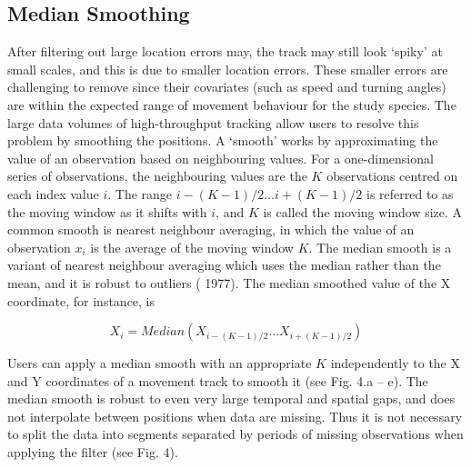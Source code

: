 \documentclass[10pt,paper=a4,headings=standardclasses
]{scrartcl}
\begin{document}
\subsection{Median Smoothing}

After filtering out large location errors may, the track may still look ‘spiky’ at small scales, and this is due to smaller location errors.
These smaller errors are challenging to remove since their covariates (such as speed and turning angles) are within the expected range of movement behaviour for the study species. 
The large data volumes of high-throughput tracking allow users to resolve this problem by smoothing the positions. 
A ‘smooth’ works by approximating the value of an observation based on neighbouring values.
For a one-dimensional series of observations, the neighbouring values are the $K$ observations centred on each index value $i$.
The range $ {i - (K-1)/2} \ldots {i + (K-1)/2} $ is referred to as the moving window as it shifts with $i$, and $K$ is called the moving window size.
A common smooth is nearest neighbour averaging, in which the value of an observation $x_i$ is the average of the moving window $K$.
The median smooth is a variant of nearest neighbour averaging which uses the median rather than the mean, and it is robust to outliers (\citeauthor{tukey1977} 1977).
The median smoothed value of the X coordinate, for instance, is
\begin{linenomath*}
    \begin{equation*}
        X_i = Median(X_{i - (K-1)/2} \ldots X_{i + (K-1)/2})
     \end{equation*}
\end{linenomath*}
Users can apply a median smooth with an appropriate $K$ independently to the X and Y coordinates of a movement track to smooth it (see Fig. 4.a -- e). 
The median smooth is robust to even very large temporal and spatial gaps, and does not interpolate between positions when data are missing. 
Thus it is not necessary to split the data into segments separated by periods of missing observations when applying the filter (see Fig. 4).
\end{document}
